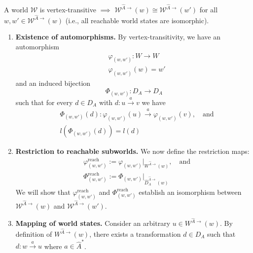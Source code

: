 \begin{propositionE}
    A world $\mathscr{W}$ is vertex-transitive $\implies$ $\mathscr{W}^{\hat{A}\to}(w) \cong \mathscr{W}^{\hat{A}\to}(w')$ for all $w, w' \in \mathscr{W}^{\hat{A}\to}(w)$ (i.e., all reachable world states are isomorphic).
\end{propositionE}
\begin{proofE}
\begin{enumerate}[(1)]
    \item \textbf{Existence of automorphisms.}
    By vertex-transitivity, we have an automorphism
    \begin{equation}
    \begin{aligned}
        & \varphi_{(w,w')}: W \to W \\
        & \varphi_{(w,w')}(w) = w'
    \end{aligned}
    \end{equation}
    and an induced bijection
    \begin{equation}
        \Phi_{(w,w')}: D_{A} \to D_{A}
    \end{equation}
    such that for every $d \in D_{A}$ with $d: u \xrightarrow{a} v$ we have
    \begin{align}
        & \Phi_{(w,w')}(d): \varphi_{(w,w')}(u) \xrightarrow{a} \varphi_{(w,w')}(v), \quad \text{and} \\
        & l(\Phi_{(w,w')}(d)) = l(d)
    \end{align}

    \item \textbf{Restriction to reachable subworlds.}
    We now define the restriction maps:
    \begin{align}
        & \varphi^{\text{reach}}_{(w,w')} := \varphi_{(w,w')}|_{W^{\hat{A}\to}(w)}, \quad \text{and} \\
        & \Phi^{\text{reach}}_{(w,w')} := \Phi_{(w,w')}|_{\hat{D}_{A}^{\hat{A}\to}(w)}
    \end{align}
    We will show that $\varphi^{\text{reach}}_{(w,w')}$ and $\Phi^{\text{reach}}_{(w,w')}$ establish an isomorphism between $\mathscr{W}^{\hat{A}\to}(w)$ and $\mathscr{W}^{\hat{A}\to}(w')$.

    \item \textbf{Mapping of world states.}
    Consider an arbitrary $u \in W^{\hat{A}\to}(w)$.
    By definition of $W^{\hat{A}\to}(w)$, there exists a transformation $d \in D_{A}$ such that $d: w \xrightarrow{a} u$ where $a \in \hat{A}^{*}$.
    

\end{enumerate}
\end{proofE}
